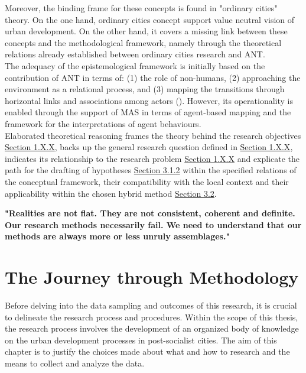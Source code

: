 \documentclass[11pt]{report}
\begin{document}
Moreover, the binding frame for these concepts is found in "ordinary cities" theory. On the one hand, ordinary cities concept support value neutral vision of urban development. On the other hand, it covers a missing link between these concepts and the methodological framework, namely through the theoretical relations already established between ordinary cities research and ANT.
\\

The adequacy of the epistemological framework is initially based on the contribution of ANT in terms of:
(1) the role of non-humans,
(2) approaching the environment as a relational process, and
(3) mapping the transitions through horizontal links and associations among actors (\href{Latour}{\citealt{latour_reassembling_2005}}).
However, its operationality is enabled through the support of MAS in terms of agent-based mapping and the framework for the interpretations of agent behaviours. 
\\

Elaborated theoretical reasoning frames the theory behind the research objectives \href{Section 1.X.X}{Section 1.X.X}, backs up the general research question defined in \href{Section 1.X.X}{Section 1.X.X}, indicates its relationship to the research problem \href{Section 1.X.X}{Section 1.X.X} and explicate the path for the drafting of hypotheses \href{Section 3.1.2}{Section 3.1.2} within the specified relations of the conceptual framework, their compatibility with the local context and their applicability within the chosen hybrid method \href{Section 3.2}{Section 3.2}.

\textbf{"Realities are not flat. They are not consistent, coherent and definite. Our research methods necessarily fail. We need to understand that our methods are always more or less unruly assemblages." \href{Law}{\citealt{law_making_2007}}}



\chapter{The Journey through Methodology}

Before delving into the data sampling and outcomes of this research, it is crucial to delineate the research process and procedures. Within the scope of this thesis, the research process involves the development of an organized body of knowledge on the urban development processes in post-socialist cities. The aim of this chapter is to justify the choices made about what and how to research and the means to collect and analyze the data.
\\
\end{document}

